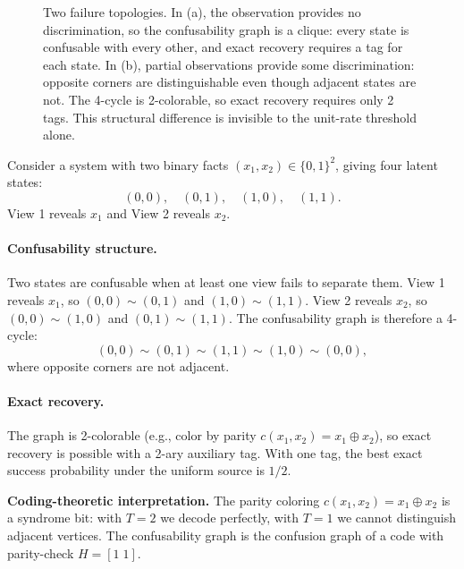 \begin{figure}[t]
{%
  }%
\fi
\caption{Two failure topologies. In (a), the observation provides no discrimination, so the confusability graph is a clique: every state is confusable with every other, and exact recovery requires a tag for each state. In (b), partial observations provide some discrimination: opposite corners are distinguishable even though adjacent states are not. The 4-cycle is 2-colorable, so exact recovery requires only 2 tags. This structural difference is invisible to the unit-rate threshold alone.}
\label{fig:failure-topology}
\end{figure}

Consider a system with two binary facts $(x_1, x_2) \in \{0,1\}^2$, giving four latent states:
\[
(0,0), \quad (0,1), \quad (1,0), \quad (1,1).
\]
View 1 reveals $x_1$ and View 2 reveals $x_2$.

\paragraph{Confusability structure.}
Two states are confusable when at least one view fails to separate them. View 1 reveals $x_1$, so $(0,0)\sim(0,1)$ and $(1,0)\sim(1,1)$. View 2 reveals $x_2$, so $(0,0)\sim(1,0)$ and $(0,1)\sim(1,1)$. The confusability graph is therefore a 4-cycle:
\[
(0,0) \sim (0,1) \sim (1,1) \sim (1,0) \sim (0,0),
\]
where opposite corners are not adjacent.

\paragraph{Exact recovery.}
The graph is 2-colorable (e.g., color by parity $c(x_1,x_2) = x_1 \oplus x_2$), so exact recovery is possible with a 2-ary auxiliary tag. With one tag, the best exact success probability under the uniform source is $1/2$.

\noindent\textbf{Coding-theoretic interpretation.} The parity coloring $c(x_1,x_2)=x_1\oplus x_2$ is a syndrome bit: with $T=2$ we decode perfectly, with $T=1$ we cannot distinguish adjacent vertices. The confusability graph is the confusion graph of a code with parity-check $H=[1\;1]$.

